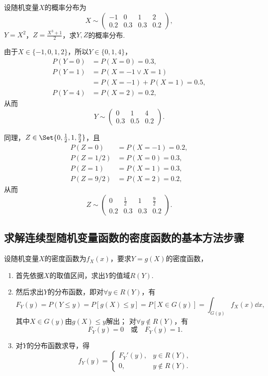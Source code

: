 \begin{example}
设随机变量\(X\)的概率分布为\[
X \sim \begin{pmatrix}
-1 & 0 & 1 & 2 \\
0.2 & 0.3 & 0.3 & 0.2
\end{pmatrix},
\]\(Y=X^2\)，\(Z=\frac{X^3+1}{2}\)，求\(Y,Z\)的概率分布.
\begin{solution}
由于\(X\in\{-1,0,1,2\}\)，所以\(Y\in\{0,1,4\}\)，\begin{align*}
P(Y=0) &= P(X=0) = 0.3, \\
P(Y=1) &= P(X=-1 \lor X=1) \\
	&= P(X=-1) + P(X=1)
	= 0.5, \\
P(Y=4) &= P(X=2) = 0.2,
\end{align*}
从而\[
Y \sim \begin{pmatrix}
0 & 1 & 4 \\
0.3 & 0.5 & 0.2
\end{pmatrix}.
\]

同理，\(Z\in\Set{0,\frac{1}{2},1,\frac{9}{2}}\)，且\begin{align*}
P(Z=0) &= P(X=-1) = 0.2, \\
P(Z=1/2) &= P(X=0) = 0.3, \\
P(Z=1) &= P(X=1) = 0.3, \\
P(Z=9/2) &= P(X=2) = 0.2,
\end{align*}
从而\[
Z \sim \begin{pmatrix}
0 & \frac{1}{2} & 1 & \frac{9}{2} \\
0.2 & 0.3 & 0.3 & 0.2
\end{pmatrix}.
\]
\end{solution}
\end{example}

\subsection{求解连续型随机变量函数的密度函数的基本方法步骤}
设随机变量\(X\)的密度函数为\(f_X(x)\)，要求\(Y = g(X)\)的密度函数，\begin{enumerate}
\item 首先依据\(X\)的取值区间，求出\(Y\)的值域\(R(Y)\).

\item 然后求出\(Y\)的分布函数，即对\(\forall y \in R(Y)\)，有\[
F_Y(y) = P(Y \leqslant y)
= P[g(X) \leqslant y]
= P[X \in G(y)]
= \int_{G(y)} f_X(x) \dd{x},
\]
其中\(X \in G(y)\)由\(g(X) \leqslant y\)解出；
对\(\forall y \notin R(Y)\)，有\[
F_Y(y) = 0
\quad\text{或}\quad
F_Y(y) = 1.
\]

\item 对\(Y\)的分布函数求导，得\[
f_Y(y) = \left\{ \begin{array}{cl}
F_Y'(y), & y \in R(Y), \\
0, & y \notin R(Y).
\end{array} \right.
\]
\end{enumerate}

